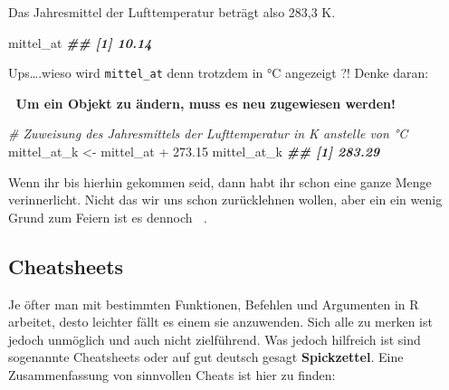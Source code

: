 \documentclass[
]{article}
\newenvironment{Shaded}{\begin{snugshade}}{\end{snugshade}}
\newcommand{\CommentTok}[1]{\textcolor[rgb]{0.56,0.35,0.01}{\textit{#1}}}
\newcommand{\DocumentationTok}[1]{\textcolor[rgb]{0.56,0.35,0.01}{\textbf{\textit{#1}}}}
\newcommand{\FloatTok}[1]{\textcolor[rgb]{0.00,0.00,0.81}{#1}}
\newcommand{\NormalTok}[1]{#1}
\newcommand{\OtherTok}[1]{\textcolor[rgb]{0.56,0.35,0.01}{#1}}
\newcommand{\SpecialCharTok}[1]{\textcolor[rgb]{0.00,0.00,0.00}{#1}}
\begin{document}
Das Jahresmittel der Lufttemperatur beträgt also 283,3 K.

\begin{Shaded}
\begin{Highlighting}[]
\NormalTok{mittel\_at}
\DocumentationTok{\#\# [1] 10.14}
\end{Highlighting}
\end{Shaded}

Ups\ldots.wieso wird \texttt{mittel\_at} denn trotzdem in °C angezeigt ?! Denke daran:

🚨 \textbf{Um ein Objekt zu ändern, muss es neu zugewiesen werden!}

\begin{Shaded}
\begin{Highlighting}[]
\CommentTok{\# Zuweisung des Jahresmittels der Lufttemperatur in K anstelle von °C}
\NormalTok{mittel\_at\_k }\OtherTok{\textless{}{-}}\NormalTok{ mittel\_at }\SpecialCharTok{+} \FloatTok{273.15}
\NormalTok{mittel\_at\_k}
\DocumentationTok{\#\# [1] 283.29}
\end{Highlighting}
\end{Shaded}

Wenn ihr bis hierhin gekommen seid, dann habt ihr schon eine ganze Menge verinnerlicht. Nicht das wir uns schon zurücklehnen wollen, aber ein ein wenig Grund zum Feiern ist es dennoch 🎉🍻.

\hypertarget{cheatsheets}{%
\subsection{Cheatsheets}\label{cheatsheets}}

Je öfter man mit bestimmten Funktionen, Befehlen und Argumenten in R arbeitet, desto leichter fällt es einem sie anzuwenden. Sich alle zu merken ist jedoch unmöglich und auch nicht zielführend. Was jedoch hilfreich ist sind sogenannte Cheatsheets oder auf gut deutsch gesagt \textbf{Spickzettel}. Eine Zusammenfassung von sinnvollen Cheats ist hier zu finden:
\end{document}
